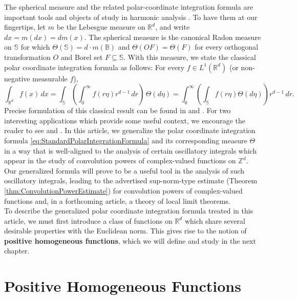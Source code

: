 \documentclass[11pt, letter]{book}
\begin{document}
\noindent The spherical measure and the related polar-coordinate integration formula are important tools and objects of study in harmonic analysis \cite{stein_harmonic_1993}. To have them at our fingertips, let $m$ be the Lebesgue measure on $\mathbb{R}^d$, and write $dx=m(dx)=dm(x)$. The spherical measure is the canonical Radon measure on $\mathbb{S}$ for which $\Theta(\mathbb{S})=d\cdot m(\mathbb{B})$ and $\Theta(OF)=\Theta(F)$ for every orthogonal transformation $O$ and Borel set $F\subseteq\mathbb{S}$. With this measure, we state the classical polar coordinate integration formula as follows: For every $f\in L^1(\mathbb{R}^d)$ (or non-negative measurable $f$),
\begin{equation}\label{eq:StandardPolarIntegrationFormula}
\int_{\mathbb{R}^d}f(x)\,dx=\int_{\mathbb{S}}\left(\int_0^\infty f(r\eta)r^{d-1}\,dr\right)\,\Theta(d\eta)=\int_0^\infty\left(\int_\mathbb{S}f(r\eta)\Theta(d\eta)\right)r^{d-1}\,dr.
\end{equation}
Precise formulation of this classical result can be found in \cite{stein_real_2009} and \cite{folland_real_2013}. For two interesting applications which provide some useful context, we encourage the reader to see \cite{baker_integration_1997} and \cite{folland_how_2001}.  In this article, we generalize the polar coordinate integration formula \eqref{eq:StandardPolarIntegrationFormula} and its corresponding measure $\Theta$ in a way that is well-aligned to the analysis of certain oscillatory integrals which appear in the study of convolution powers of complex-valued functions on $\mathbb{Z}^d$.  Our generalized formula will prove to be a useful tool in the analysis of such oscillatory integrals, leading to the advertised sup-norm-type estimate (Theorem \ref{thm:ConvolutionPowerEstimate}) for convolution powers of complex-valued functions and, in a forthcoming article, a theory of local limit theorems.\\ 

\noindent To describe the generalized polar coordinate integration formula treated in this article, we must first introduce a class of functions on $\mathbb{R}^d$ which share several desirable properties with the Euclidean norm. This gives rise to the notion of \textbf{positive homogeneous functions}, which we will define and study in the next chapter.



\chapter{Positive Homogeneous Functions}\label{chap:pos-hom-fns}
\end{document}
